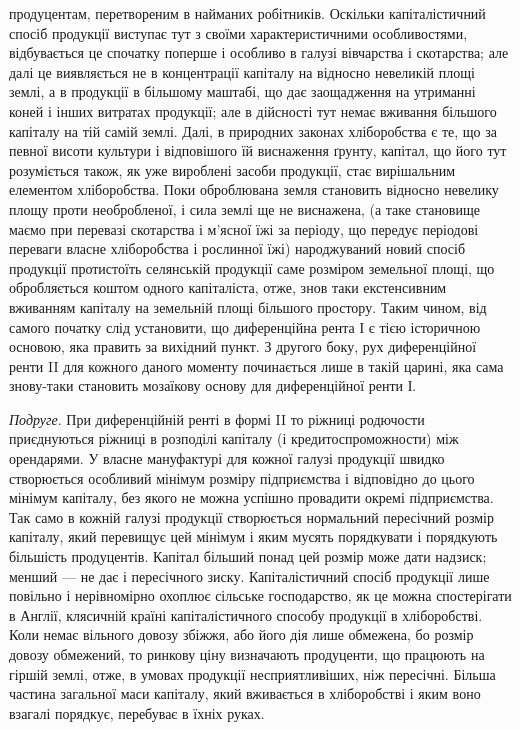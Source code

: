 \parcont{}  %
продуцентам, перетвореним в найманих робітників. Оскільки капіталістичний
спосіб продукції виступає тут з своїми характеристичними особливостями,
відбувається це спочатку поперше і особливо в галузі вівчарства і скотарства;
але далі це виявляється не в концентрації капіталу на відносно невеликій
площі землі, а в продукції в більшому маштабі, що дає заощадження на
утриманні коней і інших витратах продукції; але в дійсності тут немає вживання
більшого капіталу на тій самій землі. Далі, в природних законах хліборобства
є те, що за певної висоти культури і відповішого їй виснаження
ґрунту, капітал, що його тут розуміється також, як уже вироблені засоби
продукції, стає вирішальним елементом хліборобства. Поки оброблювана
земля становить відносно невелику площу проти необробленої, і сила землі ще
не виснажена, (а таке становище маємо при перевазі скотарства і м’ясної їжі
за періоду, що передує періодові переваги власне хліборобства і рослинної їжі)
народжуваний новий спосіб продукції протистоїть селянській продукції саме розміром
земельної площі, що обробляється коштом одного капіталіста, отже, знов таки
екстенсивним вживанням капіталу на земельній площі більшого простору. Таким
чином, від самого початку слід установити, що диференційна рента І є тією
історичною основою, яка править за вихідний пункт. З другого боку, рух диференційної
ренти II для кожного даного моменту починається лише в такій царині,
яка сама знову-таки становить мозаїкову основу для диференційної ренти І.

\emph{Подруге}. При диференційній ренті в формі II то ріжниці родючости приєднуються
ріжниці в розподілі капіталу (і кредитоспроможности) між орендарями.
У власне мануфактурі для кожної галузі продукції швидко створюється особливий
мінімум розміру підприємства і відповідно до цього мінімум капіталу,
без якого не можна успішно провадити окремі підприємства. Так само в кожній
галузі продукції створюється нормальний пересічний розмір капіталу, який
перевищує цей мінімум і яким мусять порядкувати і порядкують більшість продуцентів.
Капітал більший понад цей розмір може дати надзиск; менший — не
дає і пересічного зиску. Капіталістичний спосіб продукції лише повільно і нерівномірно
охоплює сільське господарство, як це можна спостерігати в Англії,
клясичній країні капіталістичного способу продукції в хліборобстві. Коли немає
вільного довозу збіжжя, або його дія лише обмежена, бо розмір довозу обмежений,
то ринкову ціну визначають продуценти, що працюють на гіршій землі,
отже, в умовах продукції несприятливіших, ніж пересічні. Більша частина загальної
маси капіталу, який вживається в хліборобстві і яким воно взагалі
порядкує, перебуває в їхніх руках.

